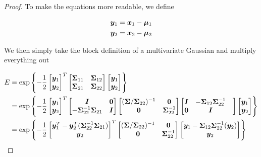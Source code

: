 \begin{proof}

To make the equations more readable, we define 

\begin{align}
{\bm{y}}_1 &= {\bm{x}}_1 - {\bm{\mu}}_1 \\
{\bm{y}}_2 &= {\bm{x}}_2 - {\bm{\mu}}_2
\end{align}


We then simply take the block definition of a multivariate Gaussian and multiply everything out

\begin{align}
E &= \exp \left\lbrace -\frac{1}{2}
\begin{bmatrix} \vy_1 \\ \vy_2 \end{bmatrix}^T
\partsigma
\begin{bmatrix} \vy_1 \\ \vy_2 \end{bmatrix} \right\rbrace \\
%
&= \exp \left\lbrace -\frac{1}{2}
\begin{bmatrix} \vy_1 \\ \vy_2 \end{bmatrix}^T
\begin{bmatrix} \mI & \mZero \\ -\mSigma_{22}^{-1} \mSigma_{21} & \mI \end{bmatrix}
\begin{bmatrix} (\mSigma/\mSigma_{22})^{-1} & \mZero \\ \mZero & \mSigma_{22}^{-1} \end{bmatrix}
\begin{bmatrix} \mI & -\mSigma_{12} \mSigma_{22}^{-1} & \\ \mZero & \mI \end{bmatrix}
\begin{bmatrix} \vy_1 \\ \vy_2 \end{bmatrix} \right\rbrace \\
%
&= \exp \left\lbrace -\frac{1}{2}
\begin{bmatrix} \vy_1^T - \vy_2^T (\mSigma_{22}^{-1} \mSigma_{21}) \\
\vy_2
\end{bmatrix}^T
\begin{bmatrix} (\mSigma/\mSigma_{22})^{-1} & \mZero \\ \mZero & \mSigma_{22}^{-1} \end{bmatrix} \begin{bmatrix} \vy_1 -\mSigma_{12} \mSigma_{22}^{-1} (\vy_2) \\ \vy_2 \end{bmatrix} \right\rbrace \\

\end{align}
\end{proof}
